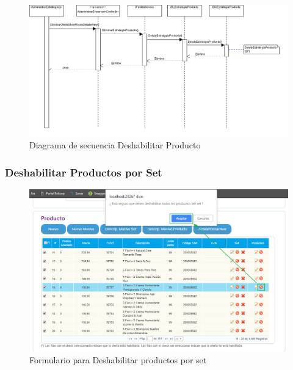 \documentclass[a4paper,11pt]{paper}
\begin{document}
\begin{landscape}
\begin{figure}[!h]
\centering
\includegraphics[width=1.5\textwidth]{imgs/Producto/EliminarProducto.png}
\caption{Diagrama de secuencia Deshabilitar Producto}
\end{figure}
\end{landscape} 




\newpage
\subsubsection{Deshabilitar Productos por Set}
\begin{figure}[h]
\centering
\includegraphics[width=1.0\textwidth]{imgs/Producto/FormularioDeshabilitarTodosProducto.png}
\caption{Formulario para Deshabilitar productos por set}
\end{figure}
\end{document}
